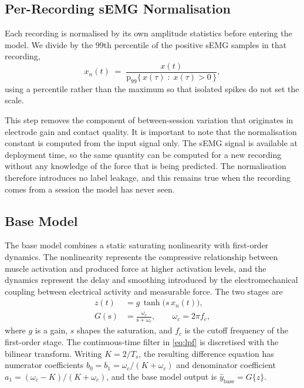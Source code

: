 \subsection{Per-Recording sEMG Normalisation}
\label{sec:semgnorm}

Each recording is normalised by its own amplitude statistics before entering the
model. We divide by the 99th percentile of the positive sEMG samples in that
recording,
\begin{equation}
  x_n(t) \;=\; \frac{x(t)}
                    {\mathrm{p}_{99}\{\,x(\tau) \;:\; x(\tau) > 0\,\}} ,
  \label{eq:semgnorm}
\end{equation}
using a percentile rather than the maximum so that isolated spikes do not set
the scale.

This step removes the component of between-session variation that originates in
electrode gain and contact quality. It is important to note that the
normalisation constant is computed from the input signal only. The sEMG signal
is available at deployment time, so the same quantity can be computed for a new
recording without any knowledge of the force that is being predicted. The
normalisation therefore introduces no label leakage, and this remains true when
the recording comes from a session the model has never seen.

\subsection{Base Model}
\label{sec:basemodel}

The base model combines a static saturating nonlinearity with first-order
dynamics. The nonlinearity represents the compressive relationship between
muscle activation and produced force at higher activation levels, and the
dynamics represent the delay and smoothing introduced by the electromechanical
coupling between electrical activity and measurable force. The two stages are
\begin{align}
  z(t) &= g \,\tanh\!\big(s\, x_n(t)\big), \label{eq:tanh} \\
  G(\mathrm{s}) &= \frac{\omega_c}{\mathrm{s} + \omega_c},
                   \qquad \omega_c = 2\pi f_c, \label{eq:lpf}
\end{align}
where $g$ is a gain, $s$ shapes the saturation, and $f_c$ is the cutoff
frequency of the first-order stage. The continuous-time filter in
\eqref{eq:lpf} is discretised with the bilinear transform. Writing
$K = 2/T_s$, the resulting difference equation has numerator coefficients
$b_0 = b_1 = \omega_c/(K + \omega_c)$ and denominator coefficient
$a_1 = (\omega_c - K)/(K + \omega_c)$, and the base model output is
$\hat{y}_{\mathrm{base}} = G\{z\}$.

